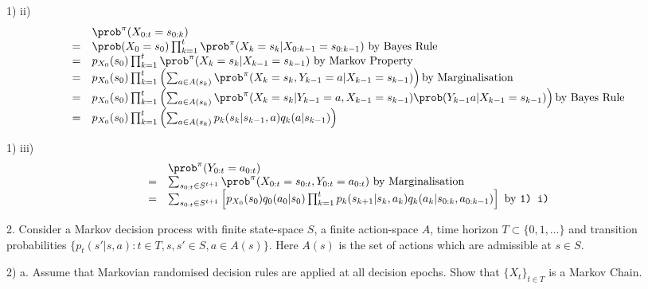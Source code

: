 \documentclass[11pt,a4paper]{article}
\begin{document}
\begin{answer}{1) ii)}
  \[\begin{array}{rl}
    &\prob^\pi(X_{0:t}=s_{0:k})\\
    =&\prob(X_0=s_0)\prod_{k=1}^t\prob^\pi(X_k=s_k|X_{0:k-1}=s_{0:k-1})\text{ by Bayes Rule}\\
    =&p_{X_0}(s_0)\prod_{k=1}^t\prob^\pi(X_k=s_k|X_{k-1}=s_{k-1})\text{ by Markov Property}\\
    =&p_{X_0}(s_0)\prod_{k=1}^t\left(\sum_{a\in A(s_k)}\prob^\pi(X_k=s_k,Y_{k-1}=a|X_{k-1}=s_{k-1})\right)\text{by Marginalisation}\\
    =&p_{X_0}(s_0)\prod_{k=1}^t\left(\sum_{a\in A(s_k)}\prob^\pi(X_k=s_k|Y_{k-1}=a,X_{k-1}=s_{k-1})\prob(Y_{k-1}a|X_{k-1}=s_{k-1})\right)\text{by Bayes Rule}\\
    =&p_{X_0}(s_0)\prod_{k=1}^t\left(\sum_{a\in A(s_k)}p_k(s_k|s_{k-1},a)q_k(a|s_{k-1})\right)
  \end{array}\]
\end{answer}

\begin{answer}{1) iii)}
  \[\begin{array}{rl}
    &\prob^\pi(Y_{0:t}=a_{0:t})\\
    =&\sum_{s_{0:t}\in S^{t+1}}\prob^\pi(X_{0:t}=s_{0:t},Y_{0:t}=a_{0:t})\text{ by Marginalisation}\\
    =&\sum_{s_{0:t}\in S^{t+1}}\left[p_{X_0}(s_0)q_0(a_0|s_0)\prod_{k=1}^tp_k(s_{k+1}|s_k,a_k)q_k(a_k|s_{0:k},a_{0:k-1})\right]\text{ by \texttt{1) i)}}
  \end{array}\]
\end{answer}

\begin{question}{2.}
  Consider a Markov decision process with finite state-space $S$, a finite action-space $A$, time horizon $T\subset\{0,1,\dots\}$ and transition probabilities $\{p_t(s'|s,a):t\in T,s,s'\in S,a\in A(s)\}$. Here $A(s)$ is the set of actions which are admissible at $s\in S$.
\end{question}

\begin{question}{2) a.}
  Assume that Markovian randomised decision rules are applied at all decision epochs. Show that $\{X_t\}_{t\in T}$ is a Markov Chain.
\end{question}
\end{document}
